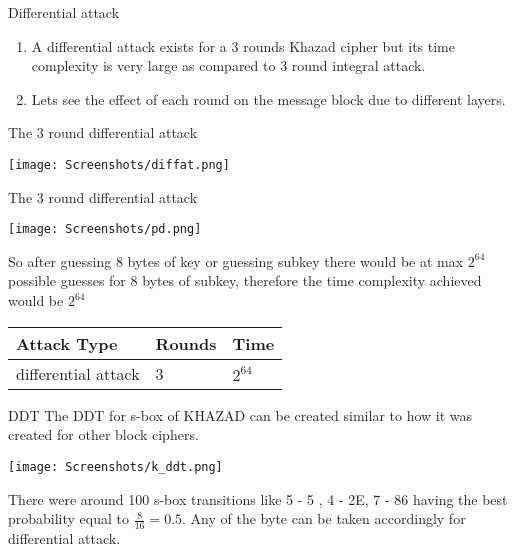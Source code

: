 \begin{frame}{Differential attack}
\begin{enumerate}
    \item A differential attack exists for a 3 rounds Khazad cipher but its time complexity is very large as compared to 3 round integral attack.
    \item Lets see the effect of each round on the message block due to different layers.
\end{enumerate}
\end{frame}

\begin{frame}{The 3 round differential attack}
    \begin{center}
        \texttt{[image: Screenshots/diffat.png]}
    \end{center}
\end{frame}

\begin{frame}{The 3 round differential attack}
\begin{center}
    \texttt{[image: Screenshots/pd.png]}
\end{center}
So after guessing 8 bytes of key or guessing subkey there would be at max $2^{64}$ possible guesses for 8 bytes of subkey, therefore the time complexity achieved would be $2^{64}$
\begin{table}[h]
\centering
\begin{tabular}{|l|l|l|}
\hline
Attack Type     & Rounds & Time     \\ \hline
differential attack & 3      & $2^{64}$  \\ \hline
\end{tabular}
\end{table} 
\end{frame}


\begin{frame}{DDT}
    The DDT for s-box of KHAZAD can be created similar to how it was created for other block ciphers.
    \begin{center}
    \texttt{[image: Screenshots/k\_ddt.png]}\\
\end{center}
There were around 100 s-box transitions like 5 - 5 ,  4 - 2E,  7 - 86  having the best probability equal to $\frac{8}{16} = 0.5$. Any of the byte can be taken accordingly for differential attack.
\end{frame}

